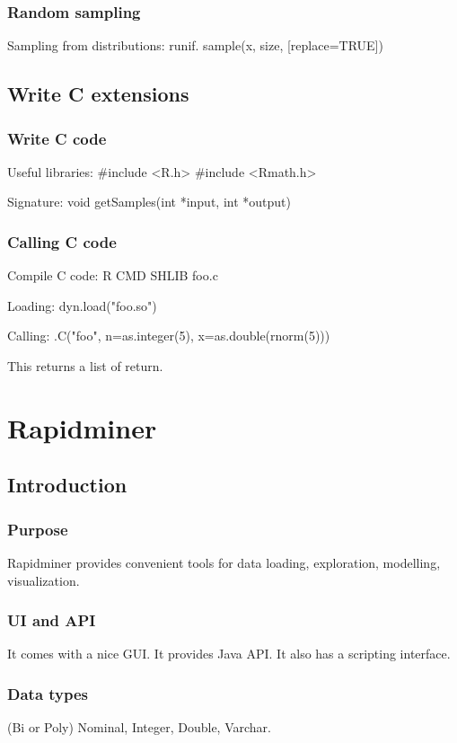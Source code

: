 \documentclass[oneside, article]{memoir}
\begin{document}
\subsection{Random sampling}
Sampling from distributions: runif. sample(x, size, [replace=TRUE])

\section{Write C extensions}
\subsection{Write C code}
Useful libraries: \#include <R.h> \#include <Rmath.h>

Signature: void getSamples(int *input, int *output)

\subsection{Calling C code}
Compile C code: R CMD SHLIB foo.c

Loading: dyn.load("foo.so")

Calling: .C("foo", n=as.integer(5), x=as.double(rnorm(5)))

This returns a list of return.

\chapter{Rapidminer}
\section{Introduction}
\subsection{Purpose}
Rapidminer provides convenient tools for data loading, exploration, modelling, visualization. 

\subsection{UI and API}
It comes with a nice GUI. It provides Java API. It also has a scripting interface.

\subsection{Data types}
(Bi or Poly) Nominal, Integer, Double, Varchar.
\end{document}
